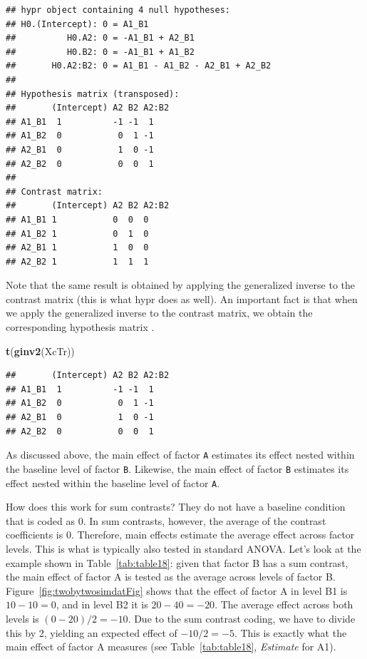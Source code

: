 \documentclass[12pt,]{krantz}
\newenvironment{Shaded}{\begin{snugshade}}{\end{snugshade}}
\newcommand{\KeywordTok}[1]{\textcolor[rgb]{0.13,0.29,0.53}{\textbf{#1}}}
\newcommand{\NormalTok}[1]{#1}
\theoremstyle{definition}
\theoremstyle{definition}
\theoremstyle{definition}
\theoremstyle{remark}
\begin{document}
\begin{verbatim}
## hypr object containing 4 null hypotheses:
## H0.(Intercept): 0 = A1_B1
##          H0.A2: 0 = -A1_B1 + A2_B1
##          H0.B2: 0 = -A1_B1 + A1_B2
##       H0.A2:B2: 0 = A1_B1 - A1_B2 - A2_B1 + A2_B2
## 
## Hypothesis matrix (transposed):
##       (Intercept) A2 B2 A2:B2
## A1_B1  1          -1 -1  1   
## A1_B2  0           0  1 -1   
## A2_B1  0           1  0 -1   
## A2_B2  0           0  0  1   
## 
## Contrast matrix:
##       (Intercept) A2 B2 A2:B2
## A1_B1 1           0  0  0    
## A1_B2 1           0  1  0    
## A2_B1 1           1  0  0    
## A2_B2 1           1  1  1
\end{verbatim}

Note that the same result is obtained by applying the generalized
inverse to the contrast matrix (this is what hypr does as well). An
important fact is that when we apply the generalized inverse to the
contrast matrix, we obtain the corresponding hypothesis matrix
\citep[for details see][]{schad2020capitalize}.

\begin{Shaded}
\begin{Highlighting}[]
\KeywordTok{t}\NormalTok{(}\KeywordTok{ginv2}\NormalTok{(XcTr))}
\end{Highlighting}
\end{Shaded}

\begin{verbatim}
##       (Intercept) A2 B2 A2:B2
## A1_B1  1          -1 -1  1   
## A1_B2  0           0  1 -1   
## A2_B1  0           1  0 -1   
## A2_B2  0           0  0  1
\end{verbatim}

As discussed above, the main effect of factor \texttt{A} estimates its
effect nested within the baseline level of factor \texttt{B}. Likewise,
the main effect of factor \texttt{B} estimates its effect nested within
the baseline level of factor \texttt{A}.

How does this work for sum contrasts? They do not have a baseline
condition that is coded as \(0\). In sum contrasts, however, the average
of the contrast coefficients is \(0\). Therefore, main effects estimate
the average effect across factor levels. This is what is typically also
tested in standard ANOVA. Let's look at the example shown in
Table~\ref{tab:table18}: given that factor B has a sum contrast, the
main effect of factor A is tested as the average across levels of factor
B. Figure~\ref{fig:twobytwosimdatFig} shows that the effect of factor A
in level B1 is \(10 - 10 = 0\), and in level B2 it is \(20 - 40 = -20\).
The average effect across both levels is \((0 - 20)/2 = -10\). Due to
the sum contrast coding, we have to divide this by 2, yielding an
expected effect of \(-10 / 2 = -5\). This is exactly what the main
effect of factor A measures (see Table~\ref{tab:table18},
\emph{Estimate} for A1).
\end{document}
